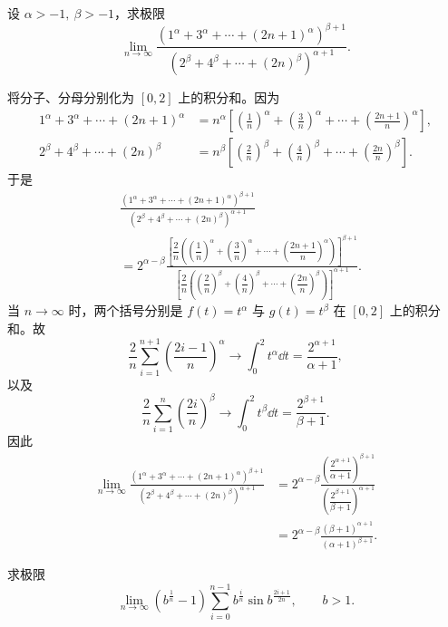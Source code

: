 \begin{problem}
	设 $\alpha>-1,\ \beta>-1$，求极限
	\[
	\lim_{n\to\infty}
	\frac{\left(1^\alpha+3^\alpha+\cdots+(2n+1)^\alpha\right)^{\beta+1}}
	{\left(2^\beta+4^\beta+\cdots+(2n)^\beta\right)^{\alpha+1}}.
	\]
\end{problem}

\begin{solution}
	将分子、分母分别化为 $[0,2]$ 上的积分和。因为
	\[
	\begin{aligned}
		1^\alpha+3^\alpha+\cdots+(2n+1)^\alpha
		&=n^\alpha\left[\left(\frac1n\right)^\alpha+
		\left(\frac3n\right)^\alpha+\cdots+
		\left(\frac{2n+1}{n}\right)^\alpha\right],\\
		2^\beta+4^\beta+\cdots+(2n)^\beta
		&=n^\beta\left[\left(\frac2n\right)^\beta+
		\left(\frac4n\right)^\beta+\cdots+
		\left(\frac{2n}{n}\right)^\beta\right].
	\end{aligned}
	\]
	于是
	\[
	\begin{aligned}
		&\frac{\left(1^\alpha+3^\alpha+\cdots+(2n+1)^\alpha\right)^{\beta+1}}
		{\left(2^\beta+4^\beta+\cdots+(2n)^\beta\right)^{\alpha+1}}\\
		&=2^{\alpha-\beta}
		\frac{\left[\dfrac2n\left(\left(\dfrac1n\right)^\alpha+
			\left(\dfrac3n\right)^\alpha+\cdots+
			\left(\dfrac{2n+1}{n}\right)^\alpha\right)\right]^{\beta+1}}
		{\left[\dfrac2n\left(\left(\dfrac2n\right)^\beta+
			\left(\dfrac4n\right)^\beta+\cdots+
			\left(\dfrac{2n}{n}\right)^\beta\right)\right]^{\alpha+1}}.
	\end{aligned}
	\]
	当 $n\to\infty$ 时，两个括号分别是 $f(t)=t^\alpha$ 与 $g(t)=t^\beta$ 在 $[0,2]$ 上的积分和。故
	\[
	\dfrac2n\sum_{i=1}^{n+1}\left(\frac{2i-1}{n}\right)^\alpha
	\to \int_0^2t^\alpha\dd t=\frac{2^{\alpha+1}}{\alpha+1},
	\]
	以及
	\[
	\dfrac2n\sum_{i=1}^{n}\left(\frac{2i}{n}\right)^\beta
	\to \int_0^2t^\beta\dd t=\frac{2^{\beta+1}}{\beta+1}.
	\]
	因此
	\[
	\begin{aligned}
		\lim_{n\to\infty}
		\frac{\left(1^\alpha+3^\alpha+\cdots+(2n+1)^\alpha\right)^{\beta+1}}
		{\left(2^\beta+4^\beta+\cdots+(2n)^\beta\right)^{\alpha+1}}
		&=2^{\alpha-\beta}
		\frac{\left(\dfrac{2^{\alpha+1}}{\alpha+1}\right)^{\beta+1}}
		{\left(\dfrac{2^{\beta+1}}{\beta+1}\right)^{\alpha+1}}\\
		&=2^{\alpha-\beta}\frac{(\beta+1)^{\alpha+1}}{(\alpha+1)^{\beta+1}}.
	\end{aligned}
	\]
\end{solution}
\begin{problem}
	求极限
	\[
	\lim_{n\to\infty}\left(b^{\frac1n}-1\right)
	\sum_{i=0}^{n-1}b^{\frac{i}{n}}\sin b^{\frac{2i+1}{2n}},\qquad b>1.
	\]
\end{problem}

